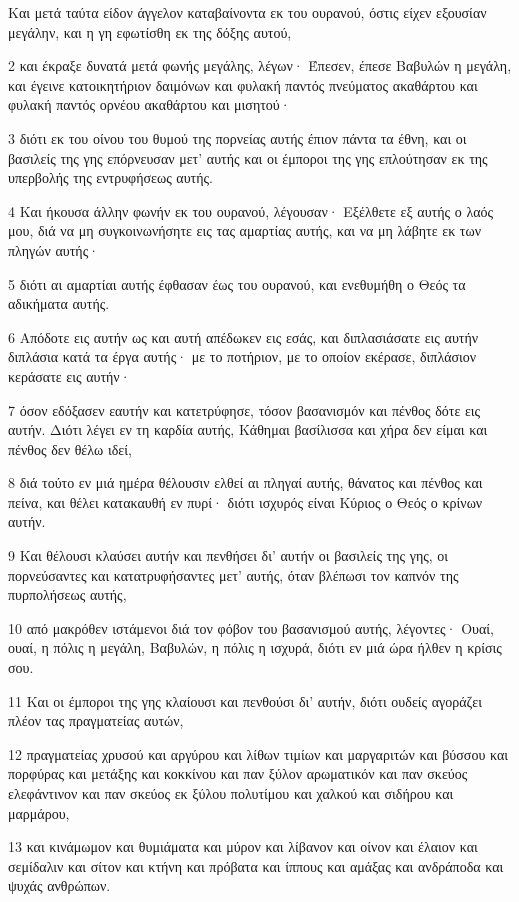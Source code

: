 \par Και μετά ταύτα είδον άγγελον καταβαίνοντα εκ του ουρανού, όστις είχεν εξουσίαν μεγάλην, και η γη εφωτίσθη εκ της δόξης αυτού,
\par 2 και έκραξε δυνατά μετά φωνής μεγάλης, λέγων· Έπεσεν, έπεσε Βαβυλών η μεγάλη, και έγεινε κατοικητήριον δαιμόνων και φυλακή παντός πνεύματος ακαθάρτου και φυλακή παντός ορνέου ακαθάρτου και μισητού·
\par 3 διότι εκ του οίνου του θυμού της πορνείας αυτής έπιον πάντα τα έθνη, και οι βασιλείς της γης επόρνευσαν μετ' αυτής και οι έμποροι της γης επλούτησαν εκ της υπερβολής της εντρυφήσεως αυτής.
\par 4 Και ήκουσα άλλην φωνήν εκ του ουρανού, λέγουσαν· Εξέλθετε εξ αυτής ο λαός μου, διά να μη συγκοινωνήσητε εις τας αμαρτίας αυτής, και να μη λάβητε εκ των πληγών αυτής·
\par 5 διότι αι αμαρτίαι αυτής έφθασαν έως του ουρανού, και ενεθυμήθη ο Θεός τα αδικήματα αυτής.
\par 6 Απόδοτε εις αυτήν ως και αυτή απέδωκεν εις εσάς, και διπλασιάσατε εις αυτήν διπλάσια κατά τα έργα αυτής· με το ποτήριον, με το οποίον εκέρασε, διπλάσιον κεράσατε εις αυτήν·
\par 7 όσον εδόξασεν εαυτήν και κατετρύφησε, τόσον βασανισμόν και πένθος δότε εις αυτήν. Διότι λέγει εν τη καρδία αυτής, Κάθημαι βασίλισσα και χήρα δεν είμαι και πένθος δεν θέλω ιδεί,
\par 8 διά τούτο εν μιά ημέρα θέλουσιν ελθεί αι πληγαί αυτής, θάνατος και πένθος και πείνα, και θέλει κατακαυθή εν πυρί· διότι ισχυρός είναι Κύριος ο Θεός ο κρίνων αυτήν.
\par 9 Και θέλουσι κλαύσει αυτήν και πενθήσει δι' αυτήν οι βασιλείς της γης, οι πορνεύσαντες και κατατρυφήσαντες μετ' αυτής, όταν βλέπωσι τον καπνόν της πυρπολήσεως αυτής,
\par 10 από μακρόθεν ιστάμενοι διά τον φόβον του βασανισμού αυτής, λέγοντες· Ουαί, ουαί, η πόλις η μεγάλη, Βαβυλών, η πόλις η ισχυρά, διότι εν μιά ώρα ήλθεν η κρίσις σου.
\par 11 Και οι έμποροι της γης κλαίουσι και πενθούσι δι' αυτήν, διότι ουδείς αγοράζει πλέον τας πραγματείας αυτών,
\par 12 πραγματείας χρυσού και αργύρου και λίθων τιμίων και μαργαριτών και βύσσου και πορφύρας και μετάξης και κοκκίνου και παν ξύλον αρωματικόν και παν σκεύος ελεφάντινον και παν σκεύος εκ ξύλου πολυτίμου και χαλκού και σιδήρου και μαρμάρου,
\par 13 και κινάμωμον και θυμιάματα και μύρον και λίβανον και οίνον και έλαιον και σεμίδαλιν και σίτον και κτήνη και πρόβατα και ίππους και αμάξας και ανδράποδα και ψυχάς ανθρώπων.
